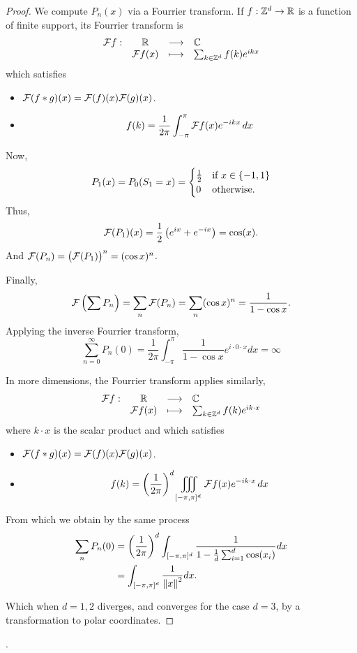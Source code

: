     \begin{proof}
        We compute $P_n(x)$ via a Fourrier transform.
        If $f: \mathbb Z^d \to \mathbb R$ is a function of finite support,
        its Fourrier transform is
        \[
            \begin{array}{rccl} \mathcal F f : & \mathbb R & \longrightarrow & \mathbb C \\ & \mathcal F f(x) & \longmapsto & 
                \sum_{k \in \mathbb Z^d} f(k) e^{ikx}
             \end{array}
        \]
        which satisfies \begin{itemize}
            \item $\mathcal F(f * g)(x) = \mathcal F(f)(x) \mathcal F(g)(x)$.
            \item \[
                f(k) = \frac{1}{2\pi} \int_{-\pi}^\pi \mathcal F f(x) e^{-ikx} \, dx
            \]
        \end{itemize}

        Now, \[
            P_1(x) = P_0(S_1 = x) = \begin{cases}
                \frac{1}{2} & \text{if } x \in \left\{ -1, 1 \right\} \\
                0 & \text{otherwise}.
            \end{cases}
        \]
        Thus,
        \[
            \mathcal F(P_1)(x) = \frac{1}{2}\left(e^{ix} + e^{-ix}\right) = \cos(x).
        \]
        And $ \mathcal F(P_n) = \big(\mathcal F(P_1)\big)^n = (\cos x)^n$.

        Finally, 
        \[
            \mathcal F\left(\sum P_n\right) = \sum_n \mathcal F(P_n) = 
            \sum_n (\cos x)^n = \frac{1}{1 - \cos x}.
        \]
        Applying the inverse Fourrier transform,
        \[
            \sum_{n = 0}^\infty P_n(0) = \frac{1}{2\pi} \int_{-\pi}^{\pi}
            \frac{1}{1 - \cos x} e^{i \cdot 0 \cdot x} dx = \infty
        \]

        In more dimensions, the Fourrier transform applies similarly,
        \[
            \begin{array}{rccl} \mathcal F f : & \mathbb R & \longrightarrow & \mathbb C \\ & \mathcal F f(x) & \longmapsto & 
                \sum_{k \in \mathbb Z^d} f(k) e^{ik \cdot x}
             \end{array}
        \]
        where $k \cdot x$ is the scalar product and which satisfies \begin{itemize}
            \item $\mathcal F(f * g)(x) = \mathcal F(f)(x) \mathcal F(g)(x)$.
            \item \[
                f(k) = \left(\frac{1}{2\pi}\right)^d
                 \iiint_{[-\pi, \pi]^d} \mathcal F f(x) e^{-ik \cdot x} \, dx
            \]
        \end{itemize}

        From which we obtain by the same process 
        \begin{align*}
            \sum_n P_n(0) &= 
                \left(\frac{1}{2\pi}\right)^d
                \int_{[-\pi, \pi]^d} 
                \frac{1}{1 - \frac{1}{d} \sum_{i = 1}^d \cos(x_i)} dx
            \\&= 
                \int_{[-\pi, \pi]^d} 
                \frac{1}{\left\| x \right\|^2} dx.
        \end{align*}

        Which when $d = 1, 2$ diverges, and converges for the case $d = 3$, 
        by a transformation to polar coordinates.
    \end{proof}


    \newpage
    .

